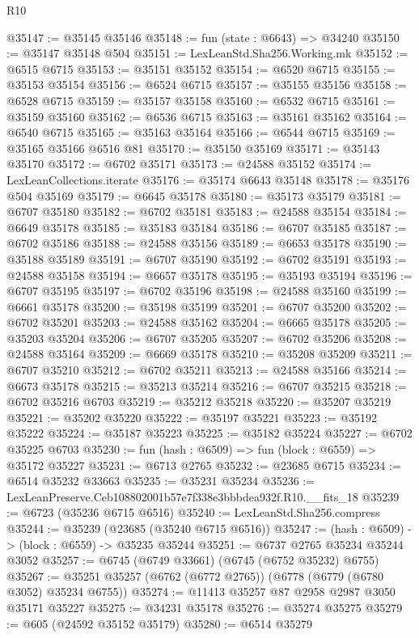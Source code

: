\begin{lexlean}{R10}
\begin{coremodule}
@35147 := @35145 @35146
@35148 := fun (state : @6643) => @34240
@35150 := @35147 @35148 @504
@35151 := LexLeanStd.Sha256.Working.mk
@35152 := @6515 @6715
@35153 := @35151 @35152
@35154 := @6520 @6715
@35155 := @35153 @35154
@35156 := @6524 @6715
@35157 := @35155 @35156
@35158 := @6528 @6715
@35159 := @35157 @35158
@35160 := @6532 @6715
@35161 := @35159 @35160
@35162 := @6536 @6715
@35163 := @35161 @35162
@35164 := @6540 @6715
@35165 := @35163 @35164
@35166 := @6544 @6715
@35169 := @35165 @35166 @6516 @81
@35170 := @35150 @35169
@35171 := @35143 @35170
@35172 := @6702 @35171
@35173 := @24588 @35152
@35174 := LexLeanCollections.iterate
@35176 := @35174 @6643 @35148
@35178 := @35176 @504 @35169
@35179 := @6645 @35178
@35180 := @35173 @35179
@35181 := @6707 @35180
@35182 := @6702 @35181
@35183 := @24588 @35154
@35184 := @6649 @35178
@35185 := @35183 @35184
@35186 := @6707 @35185
@35187 := @6702 @35186
@35188 := @24588 @35156
@35189 := @6653 @35178
@35190 := @35188 @35189
@35191 := @6707 @35190
@35192 := @6702 @35191
@35193 := @24588 @35158
@35194 := @6657 @35178
@35195 := @35193 @35194
@35196 := @6707 @35195
@35197 := @6702 @35196
@35198 := @24588 @35160
@35199 := @6661 @35178
@35200 := @35198 @35199
@35201 := @6707 @35200
@35202 := @6702 @35201
@35203 := @24588 @35162
@35204 := @6665 @35178
@35205 := @35203 @35204
@35206 := @6707 @35205
@35207 := @6702 @35206
@35208 := @24588 @35164
@35209 := @6669 @35178
@35210 := @35208 @35209
@35211 := @6707 @35210
@35212 := @6702 @35211
@35213 := @24588 @35166
@35214 := @6673 @35178
@35215 := @35213 @35214
@35216 := @6707 @35215
@35218 := @6702 @35216 @6703
@35219 := @35212 @35218
@35220 := @35207 @35219
@35221 := @35202 @35220
@35222 := @35197 @35221
@35223 := @35192 @35222
@35224 := @35187 @35223
@35225 := @35182 @35224
@35227 := @6702 @35225 @6703
@35230 := fun (hash : @6509) => fun (block : @6559) => @35172 @35227
@35231 := @6713 @2765
@35232 := @23685 @6715
@35234 := @6514 @35232 @33663
@35235 := @35231 @35234
@35236 := LexLeanPreserve.Ceb108802001b57e7f338e3bbbdea932f.R10.__fits_18
@35239 := @6723 (@35236 @6715 @6516)
@35240 := LexLeanStd.Sha256.compress
@35244 := @35239 (@23685 (@35240 @6715 @6516))
@35247 := (hash : @6509) -> (block : @6559) -> @35235 @35244
@35251 := @6737 @2765 @35234 @35244 @3052
@35257 := @6745 (@6749 @33661) (@6745 (@6752 @35232) @6755)
@35267 := @35251 @35257 (@6762 (@6772 @2765)) (@6778 (@6779 (@6780 @3052) @35234 @6755))
@35274 := @11413 @35257 @87 @2958 @2987 @3050 @35171 @35227
@35275 := @34231 @35178
@35276 := @35274 @35275
@35279 := @605 (@24592 @35152 @35179)
@35280 := @6514 @35279

\end{coremodule}
\end{lexlean}
